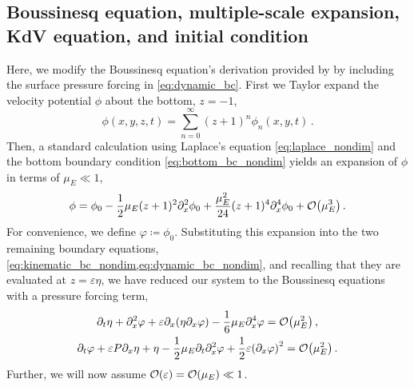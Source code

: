 \documentclass{jfm}
\renewcommand*{\epsilon}{\varepsilon}
\begin{document}
\subsection{Boussinesq equation, multiple-scale expansion, KdV equation,
and initial condition}
Here, we modify the Boussinesq equation's derivation provided by
\citet{mei2005nonlinear} by including the surface pressure forcing in
\cref{eq:dynamic_bc}.
First we Taylor expand the velocity potential $\phi$ about the bottom,
$z=-1$,
\begin{equation}
  \phi(x,y,z,t) = \sum_{n=0}^\infty (z+1)^n\phi_n(x,y,t) \,.
\end{equation}
Then, a standard calculation \citep[\eg][]{mei2005nonlinear} using
Laplace's equation \cref{eq:laplace_nondim} and the bottom boundary
condition \cref{eq:bottom_bc_nondim} yields an expansion of $\phi$ in
terms of $\mu_E \ll 1$,
\begin{equation}
  \phi = \phi_0 - \frac{1}{2}\mu_E (z+1)^2\partial^2_x\phi_0 +
  \frac{\mu_E^2}{24}(z+1)^4\partial^4_x\phi_0 +
  \order{\mu_E^3} \,.
\end{equation}
For convenience, we define $\varphi \coloneqq \phi_0$.
Substituting this expansion into the two remaining boundary equations,
\cref{eq:kinematic_bc_nondim,eq:dynamic_bc_nondim}, and recalling that
they are evaluated at $z=\epsilon \eta$, we have reduced our system to
the Boussinesq equations with a pressure forcing term,
\begin{gather}
  \partial_t \eta + \partial_x^2 \varphi + \epsilon \partial_x
    \pqty{\eta \partial_x \varphi} -\frac{1}{6}\mu_E \partial^4_x
    \varphi = \order{\mu_E^2} \label{eq:kinematic_bc_varphi} \,, \\
  \partial_t \varphi + \epsilon P \partial_x \eta + \eta -
    \frac{1}{2}\mu_E \partial_t \partial_x^2 \varphi +
    \frac{1}{2}\epsilon\pqty{\partial_x \varphi}^2 = \order{\mu_E^2} \,.
    \label{eq:dynamic_bc_varphi}
\end{gather}
Further, we will now assume $\order{\epsilon} = \order{\mu_E} \ll 1$.
\end{document}
